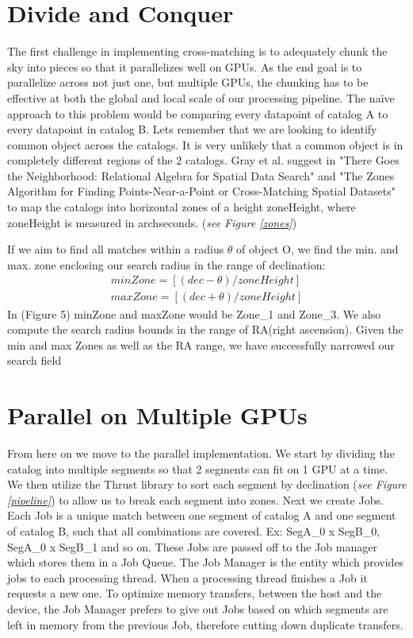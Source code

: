 \documentclass[11pt,twoside]{article}
\begin{document}
\section{Divide and Conquer}
The first challenge in implementing cross-matching is to adequately chunk the sky into pieces so that it parallelizes well on GPUs. As the end goal is to parallelize across not just one, but multiple GPUs, the chunking has to be effective at both the global and local scale of our processing pipeline. The na\"{i}ve approach to this problem would be comparing every datapoint of catalog A to every datapoint in catalog B. Lets remember that we are looking to identify common object across the catalogs. It is very unlikely that a common object is in completely different regions of the 2 catalogs. Gray et al. suggest in "There Goes the Neighborhood: Relational Algebra for Spatial Data Search" \citet{gray2004there} and "The Zones Algorithm for Finding Points-Near-a-Point or Cross-Matching Spatial Datasets" \citet{gray2007zones} to map the catalogs into horizontal zones of a height zoneHeight, where zoneHeight is measured in archseconds. (\textit{see Figure \ref{zones}})

If we aim to find all matches within a radius $\theta$ of object O, we find the min. and max. zone enclosing our search radius in the range of declination:
\begin{eqnarray}
minZone = [(dec - \theta) / zoneHeight]\nonumber\\
maxZone = [(dec + \theta) / zoneHeight]
\end{eqnarray}
In (Figure 5) minZone and maxZone would be Zone\_1 and Zone\_3. We also compute the search radius bounds in the range of RA(right ascension). Given the min and max Zones as well as the RA range, we have successfully narrowed our search field

\section{Parallel on Multiple GPUs}
From here on we move to the parallel implementation. We start by dividing the catalog into multiple segments so that 2 segments can fit on 1 GPU at a time. We then utilize the Thrust library to sort each segment by declination (\textit{see Figure \ref{pipeline}}) to allow us to break each segment into zones. Next we create Jobs. Each Job is a unique match between one segment of catalog A and one segment of catalog B, such that all combinations are covered. Ex: SegA\_0 x SegB\_0, SegA\_0 x SegB\_1 and so on. These Jobs are passed off to the Job manager which stores them in a Job Queue. The Job Manager is the entity which provides jobs to each processing thread. When a processing thread finishes a Job it requests a new one. To optimize memory transfers, between the host and the device, the Job Manager prefers to give out Jobs based on which segments are left in memory from the previous Job, therefore cutting down duplicate transfers.
\end{document}
